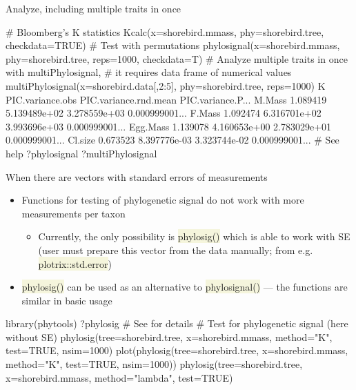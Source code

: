 \documentclass[compress, xelatex, 11pt, xcolor=svgnames, aspectratio=169, url={hyphens, lowtilde}]{beamer}
\renewcommand{\texttt}[1]{\colorbox{Beige}{{\ttfamily #1}}}
\begin{document}
\begin{frame}[fragile]{Analyze, including multiple traits in once}
	\begin{spluscode}
    # Bloomberg's K statistics
    Kcalc(x=shorebird.mmass, phy=shorebird.tree, checkdata=TRUE)
    # Test with permutations
    phylosignal(x=shorebird.mmass, phy=shorebird.tree, reps=1000, checkdata=T)
    # Analyze multiple traits in once with multiPhylosignal,
    # it requires data frame of numerical values
    multiPhylosignal(x=shorebird.data[,2:5], phy=shorebird.tree, reps=1000)
                    K PIC.variance.obs PIC.variance.rnd.mean PIC.variance.P...
    M.Mass   1.089419     5.139489e+02          3.278559e+03    0.000999001...
    F.Mass   1.092474     6.316701e+02          3.993696e+03    0.000999001...
    Egg.Mass 1.139078     4.160653e+00          2.783029e+01    0.000999001...
    Cl.size  0.673523     8.397776e-03          3.323744e-02    0.000999001...
    # See help
    ?phylosignal
    ?multiPhylosignal
	\end{spluscode}
\end{frame}

\begin{frame}[fragile]{When there are vectors with standard errors of measurements}
	\begin{itemize}
		\item Functions for testing of phylogenetic signal do not work with more measurements per taxon
		\begin{itemize}
			\item Currently, the only possibility is \texttt{phylosig()} which is able to work with SE (user must prepare this vector from the data manually; from e.g. \texttt{plotrix::std.error})
		\end{itemize}
		\item \texttt{phylosig()} can be used as an alternative to \texttt{phylosignal()} --- the functions are similar in basic usage
	\end{itemize}
	\begin{spluscode}
    library(phytools)
    ?phylosig # See for details
    # Test for phylogenetic signal (here without SE)
    phylosig(tree=shorebird.tree, x=shorebird.mmass, method="K", test=TRUE,
      nsim=1000)
    plot(phylosig(tree=shorebird.tree, x=shorebird.mmass, method="K",
      test=TRUE, nsim=1000))
    phylosig(tree=shorebird.tree, x=shorebird.mmass, method="lambda",
      test=TRUE)
	\end{spluscode}
\end{frame}
\end{document}
